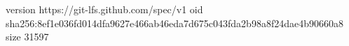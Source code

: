 version https://git-lfs.github.com/spec/v1
oid sha256:8ef1e036fd014dfa9627e466ab46eda7d675c043fda2b98a8f24dae4b90660a8
size 31597
